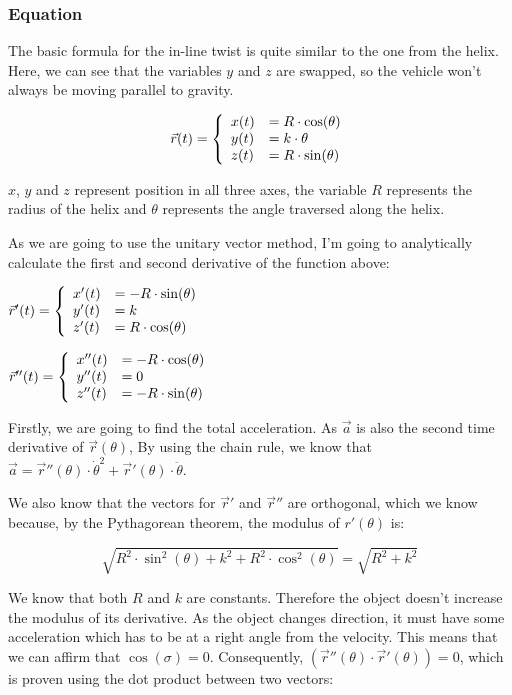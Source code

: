 \documentclass[12pt,twoside,a4paper]{article}
\begin{document}
	\subsubsection{Equation}
	The basic formula for the in-line twist is quite similar to the one from the helix. Here, we can see that the variables $y$ and $z$ are swapped, so the vehicle won't always be moving parallel to gravity.
	
	$$\vec{r}(t) = \left\{\begin{array}{ll}
		x(t) &= R \cdot \cos(\theta) \cr
		y(t) &= k \cdot \theta \cr
		z(t) &= R \cdot \sin(\theta)
  	\end{array}\right.$$
	
	$x$, $y$ and $z$ represent position in all three axes, the variable $R$ represents the radius of the helix and $\theta$ represents the angle traversed along the helix.
	
	As we are going to use the unitary vector method, I'm going to analytically calculate the first and second derivative of the function above:
	
	$\vec{r}'(t) = \left\{\begin{array}{ll}
		x'(t) &= - R \cdot \sin(\theta) \cr
		y'(t) &= k \cr
		z'(t) &= R \cdot \cos(\theta)
	\end{array}\right.$
	
	$\vec{r}''(t) = \left\{\begin{array}{ll}
		x''(t) &= - R \cdot \cos(\theta) \cr
		y''(t) &= 0 \cr
		z''(t) &= - R \cdot \sin(\theta)
	\end{array}\right.$
	
	Firstly, we are going to find the total acceleration. As $\vec{a}$ is also the second time derivative of $\vec{r}(\theta)$, By using the chain rule, we know that
	$\vec{a} = \vec{r}''(\theta) \cdot \dot{\theta}^2 + \vec{r}'(\theta) \cdot \ddot{\theta}$.
	
	We also know that the vectors for $\vec{r}'$ and $\vec{r}''$ are orthogonal, which we know because, by the Pythagorean theorem, the modulus of $r'(\theta)$ is:
	
	$$\sqrt{R^2 \cdot \sin^2(\theta) + k^2 + R^2 \cdot \cos^2(\theta)} = \sqrt{R^2 + k^2}$$
	
	We know that both $R$ and $k$ are constants. Therefore the object doesn't increase the modulus of its derivative. As the object changes direction, it must have some acceleration which has to be at a right angle from the velocity. This means that we can affirm that $\cos(\sigma) = 0$. Consequently, $(\vec{r}''(\theta) \cdot \vec{r}'(\theta)) = 0$, which is proven using the dot product between two vectors:
	
\end{document}
